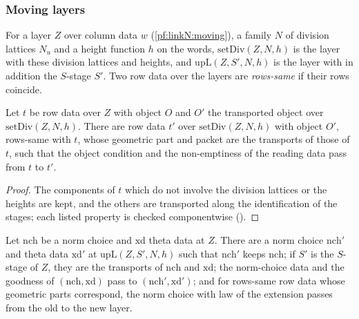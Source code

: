 \subsubsection{Moving layers}\label{sec:pf:stageU:moving}

For a layer $Z$ over column data $w$ (\cref{pf:linkN:moving}), a family $N$ of division lattices $N_u$ and a height function
$h$ on the words, $\mathrm{setDiv}(Z,N,h)$ is the layer with these division lattices and heights, and $\mathrm{upL}(Z,S',N,h)$ is the layer
with in addition the $S$-stage $S'$. Two row data over the layers are \emph{rows-same} if their rows coincide.

\begin{lemma}\label{pf:stageU:rowsmove}
Let $t$ be row data over $Z$ with object $O$ and $O'$ the transported object over $\mathrm{setDiv}(Z,N,h)$. There are row data $t'$ over
$\mathrm{setDiv}(Z,N,h)$ with object $O'$, rows-same with $t$, whose geometric part and packet are the transports of those of $t$, such that
the object condition and the non-emptiness of the reading data pass from $t$ to $t'$.
\end{lemma}

\begin{proof}
The components of $t$ which do not involve the division lattices or the heights are kept, and the others are transported along
the identification of the stages; each listed property is checked componentwise
().
\end{proof}

\begin{lemma}\label{pf:stageU:keptchoice}
Let $\mathrm{nch}$ be a norm choice and $\mathrm{xd}$ theta data at $Z$. There are a norm choice $\mathrm{nch}'$ and theta data $\mathrm{xd}'$ at
$\mathrm{upL}(Z,S',N,h)$ such that $\mathrm{nch}'$ keeps $\mathrm{nch}$; if $S'$ is the $S$-stage of $Z$, they are the transports of $\mathrm{nch}$
and $\mathrm{xd}$; the norm-choice data and the goodness of $(\mathrm{nch},\mathrm{xd})$ pass to $(\mathrm{nch}',\mathrm{xd}')$; and for rows-same row data
whose geometric parts correspond, the norm choice with law of the extension passes from the old to the new layer.
\end{lemma}

